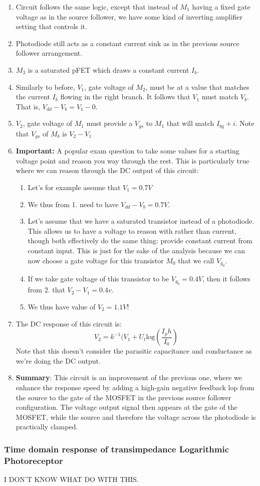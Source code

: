 \begin{enumerate}
    \item Circuit follows the same logic, except that instead of $M_1$ having a fixed gate voltage as in the source follower, we have some kind of inverting amplifier setting that controls it. 
    \item Photodiode still acts as a constant current sink as in the previous source follower arrangement.
    \item $M_3$ is a saturated pFET which draws a constant current $I_b$. 
    \item Similarly to before, $V_1$, gate voltage of $M_2$, must be at a value that matches the current $I_b$ flowing in the right branch. It follows that $V_1$ must match $V_b$. That is, $V_{dd} - V_b = V_1 - 0$.
    \item $V_2$, gate voltage of $M_1$ must provide a $V_{gs}$ to $M_1$ that will match $I_{bg} + i$. Note that $V_{gs}$ of $M_b$ is $V_2 - V_1$
    \item \textbf{Important:} A popular exam question to take some values for a starting voltage point and reason you way through the rest. This is particularly true where we can reason through the DC output of this circuit: 
    \begin{enumerate}
        \item Let's for example assume that $V_1 = 0.7V$
        \item We thus from 1. need to have $V_{dd} - V_b = 0.7V$.
        \item Let's assume that we have a saturated transistor instead of a photodiode. This allows us to have a voltage to reason with rather than current, though both effectively do the same thing: provide constant current from constant input. This is just for the sake of the analysis because we can now choose a gate voltage for this transistor $M_0$ that we call $V_g_0$.
        \item If we take gate voltage of this transistor to be $V_g_0 = 0.4 V$, then it follows from 2. that $V_2 - V_1 = 0.4 v$. 
        \item We thus have value of $V_2 = 1.1 V$! 
    \end{enumerate}
    \item The DC response of this circuit is: 
    \begin{equation}
        V_2 = k^{-1}(V_1 + U_t\mathrm{log}(\frac{I_ph}{I_0})
    \end{equation}
    Note that this doesn't consider the parasitic capacitance and conductance as we're doing the DC output. 
    \item \textbf{Summary}: This circuit is an improvement of the previous one, where we enhance the response speed by adding a high-gain negative feedback lop from the source to the gate of the MOSFET in the previous source follower configuration. The voltage output signal then appears at the gate of the MOSFET, while the source and therefore the voltage across the photodiode is practically clamped.
\end{enumerate}

\subsubsection{Time domain response of transimpedance Logarithmic Photoreceptor}

I DON'T KNOW WHAT DO WITH THIS. 

  